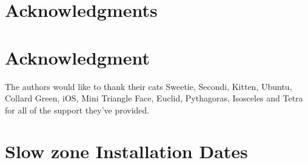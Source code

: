 \documentclass[10pt,journal,compsoc]{IEEEtran}
\begin{document}
\ifCLASSOPTIONcompsoc
  \section*{Acknowledgments}
\else
  \section*{Acknowledgment}
\fi


The authors would like to thank their cats Sweetie, Secondi, Kitten, Ubuntu, Collard Green, iOS, Mini Triangle Face, Euclid, Pythagoras, Isosceles and Tetra for all of the support they've provided.

\appendices
\section{Slow zone  Installation Dates}
\label{sec:appendixa}
\end{document}
